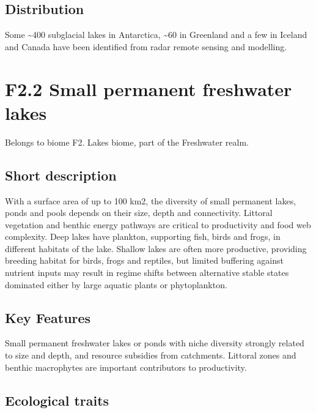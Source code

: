 \documentclass[
  letterpaper,
  DIV=11,
  numbers=noendperiod]{scrartcl}
\begin{document}
\subsection{Distribution}\label{distribution-117}

Some \textasciitilde400 subglacial lakes in Antarctica,
\textasciitilde60 in Greenland and a few in Iceland and Canada have been
identified from radar remote sensing and modelling.

\section{F2.2 Small permanent freshwater
lakes}\label{f2.2-small-permanent-freshwater-lakes-1}

Belongs to biome F2. Lakes biome, part of the Freshwater realm.

\subsection{Short description}\label{short-description-118}

With a surface area of up to 100 km2, the diversity of small permanent
lakes, ponds and pools depends on their size, depth and connectivity.
Littoral vegetation and benthic energy pathways are critical to
productivity and food web complexity. Deep lakes have plankton,
supporting fish, birds and frogs, in different habitats of the lake.
Shallow lakes are often more productive, providing breeding habitat for
birds, frogs and reptiles, but limited buffering against nutrient inputs
may result in regime shifts between alternative stable states dominated
either by large aquatic plants or phytoplankton.

\subsection{Key Features}\label{key-features-118}

Small permanent freshwater lakes or ponds with niche diversity strongly
related to size and depth, and resource subsidies from catchments.
Littoral zones and benthic macrophytes are important contributors to
productivity.

\subsection{Ecological traits}\label{ecological-traits-118}
\end{document}
